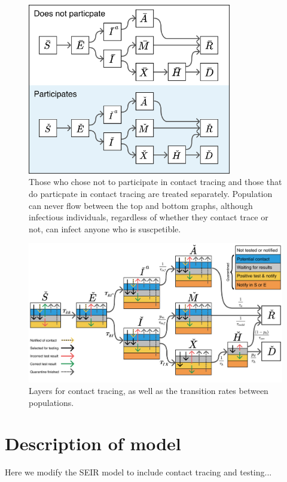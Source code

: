 \documentclass[notitlepage, superscriptaddress]{revtex4-2}
\begin{document}
\begin{figure}
\centering
\includegraphics[width=3.5in]{SEIR with contact tracing}
\caption{\label{f:SEIR-contactSeparation}
 Those who chose not to participate in contact tracing and those that do particpate in contact tracing are treated separately. Population can never flow between the top and bottom graphs, although infectious individuals, regardless of whether they contact trace or not, can infect anyone who is suscpetible.}
\end{figure}

\begin{figure}
\centering
\includegraphics[width=6.5in]{SEIR_testing_and__contact_transitions}
\caption{\label{f:SEIR-contact}
 Layers for contact tracing, as well as the transition rates between populations.}
\end{figure}


\section{Description of model}
Here we modify the SEIR model to include contact tracing and testing...
\end{document}
